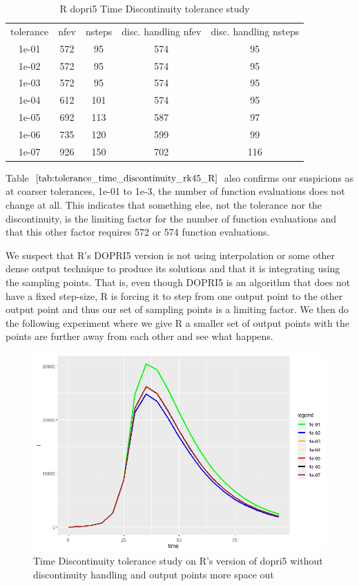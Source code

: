\begin{table}[h]
\caption {R dopri5 Time Discontinuity tolerance study} \label{tab:tolerance_time_discontinuity_rk45_R} 
\begin{center}
\begin{tabular}{ c c c c c }
tolerance & nfev & nsteps & disc. handling nfev & disc. handling nsteps \\ 
1e-01 & 572 &  95 & 574 &  95 \\
1e-02 & 572 &  95 & 574 &  95 \\
1e-03 & 572 &  95 & 574 &  95 \\
1e-04 & 612 & 101 & 574 &  95 \\
1e-05 & 692 & 113 & 587 &  97 \\
1e-06 & 735 & 120 & 599 &  99 \\
1e-07 & 926 & 150 & 702 & 116 \\
\end{tabular}
\end{center}
\end{table}

Table $\ref{tab:tolerance_time_discontinuity_rk45_R}$ also confirms our suspicions as at coarser tolerances, 1e-01 to 1e-3, the number of function evaluations does not change at all. This indicates that something else, not the tolerance nor the discontinuity, is the limiting factor for the number of function evaluations and that this other factor requires 572 or 574 function evaluations.

We suspect that R's DOPRI5 version is not using interpolation or some other dense output technique to produce its solutions and that it is integrating using the sampling points. That is, even though DOPRI5 is an algorithm that does not have a fixed step-size, R is forcing it to step from one output point to the other output point and thus our set of sampling points is a limiting factor. We then do the following experiment where we give R a smaller set of output points with the points are further away from each other and see what happens.

\begin{figure}[h]
	\centering
	\includegraphics[width=0.7\linewidth]{./figures/tolerance_time_rk45_further_no_event_R}
	\caption{Time Discontinuity tolerance study on R's version of dopri5 without discontinuity handling and output points more space out}
	\label{fig:tolerance_time_rk45_further_no_event_R}
\end{figure}


